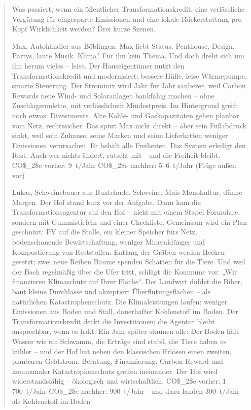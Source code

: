 \documentclass[12pt,a4paper]{scrartcl}
\begin{document}
\begin{quote}
Was passiert, wenn ein öffentlicher Transformationskredit, eine verlässliche Vergütung für eingesparte Emissionen und eine lokale Rückerstattung pro Kopf Wirklichkeit werden? Drei kurze Szenen.	
    

Max, Autohändler aus Böblingen. Max liebt Status. Penthouse, Design, Partys, laute Musik. Klima? Für ihn kein Thema. Und doch dreht sich um ihn herum vieles -- leise. Der Hauseigentümer nutzt den Transformationskredit und modernisiert: bessere Hülle, leise Wärmepumpe, smarte Steuerung. Der Strommix wird Jahr für Jahr sauberer, weil Carbon Rewards neue Wind- und Solaranlagen bankfähig machen -- ohne Zuschlagsroulette, mit verlässlichem Mindestpreis. Im Hintergrund greift noch etwas: Divestments. Alte Kohle- und Gaskapazitäten gehen planbar vom Netz, rechtssicher. Das spürt Max nicht direkt -- aber sein Fußabdruck sinkt, weil sein Zuhause, seine Marken und seine Lieferketten weniger Emissionen verursachen. Er behält alle Freiheiten. Das System erledigt den Rest. Auch wer nichts ändert, rutscht mit - und die Freiheit bleibt. CO\$\_2\$e vorher: 9 t/Jahr CO\$\_2\$e nachher: 5--6 t/Jahr (Flüge außen vor)

Lukas, Schweinebauer aus Buxtehude. Schweine, Mais-Monokultur, dünne Margen. Der Hof stand kurz vor der Aufgabe. Dann kam die Transformationsagentur auf den Hof -- nicht mit einem Stapel Formulare, sondern mit Gummistiefeln und einer Checkliste. Gemeinsam wird ein Plan geschnürt: PV auf die Ställe, ein kleiner Speicher fürs Netz, bodenschonende Bewirtschaftung, weniger Mineraldünger und Kompostierung von Reststoffen. Entlang der Gräben werden Hecken gesetzt; zwei neue Reihen Bäume spenden Schatten für die Tiere. Und weil der Bach regelmäßig über die Ufer tritt, schlägt die Kommune vor: „Wir finanzieren Klimaschutz auf Ihrer Fläche“. Der Landwirt duldet die Biber, baut kleine Durchlässe und akzeptiert Überflutungsflächen -- als natürlichen Katastrophenschutz. Die Klimaleistungen laufen: weniger Emissionen aus Boden und Stall, dauerhafter Kohlenstoff im Boden. Der Transformationskredit deckt die Investitionen; die Agentur bleibt ansprechbar, wenn es hakt. Ein Jahr später staunen alle: Der Boden hält Wasser wie ein Schwamm, die Erträge sind stabil, die Tiere haben es kühler -- und der Hof hat neben den klassischen Erlösen einen zweiten, planbaren Geldstrom. Beratung, Finanzierung, Carbon Reward und kommunaler Katastrophenschutz greifen ineinander. Der Hof wird widerstandsfähig -- ökologisch und wirtschaftlich. CO\$\_2\$e vorher: 1 700 t/Jahr CO\$\_2\$e nachher: 900 t/Jahr - und dazu landen 300 t/Jahr als Kohlenstoff im Boden


\end{quote}
\end{document}
